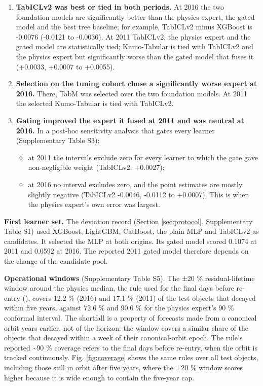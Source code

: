 \documentclass[
]{article}
\providecommand{\tightlist}{%
  \setlength{\itemsep}{0pt}\setlength{\parskip}{0pt}}
\begin{document}
\begin{enumerate}
\def\labelenumi{\arabic{enumi}.}
\tightlist
\item
  \textbf{TabICLv2 was best or tied in both periods.} At 2016 the two
  foundation models are significantly better than the physics expert,
  the gated model and the best tree baseline; for example, TabICLv2
  minus XGBoost is -0.0076 (-0.0121 to -0.0036). At 2011 TabICLv2, the
  physics expert and the gated model are statistically tied;
  Kumo-Tabular is tied with TabICLv2 and the physics expert but
  significantly worse than the gated model that fuses it (+0.0033,
  +0.0007 to +0.0055).
\item
  \textbf{Selection on the tuning cohort chose a significantly worse
  expert at 2016.} There, TabM was selected over the two foundation
  models. At 2011 the selected Kumo-Tabular is tied with TabICLv2.
\item
  \textbf{Gating improved the expert it fused at 2011 and was neutral at
  2016.} In a post-hoc sensitivity analysis that gates every learner
  (Supplementary Table S3):

  \begin{itemize}
  \tightlist
  \item
    at 2011 the intervals exclude zero for every learner to which the
    gate gave non-negligible weight (TabICLv2: +0.0027);
  \item
    at 2016 no interval excludes zero, and the point estimates are
    mostly slightly negative (TabICLv2 -0.0046, -0.0112 to +0.0007).
    This is when the physics expert's own error was largest.
  \end{itemize}
\end{enumerate}

\textbf{First learner set.} The deviation record (Section
\ref{sec:protocol}, Supplementary Table S1) used XGBoost, LightGBM,
CatBoost, the plain MLP and TabICLv2 as candidates. It selected the MLP
at both origins. Its gated model scored 0.1074 at 2011 and 0.0592 at
2016. The reported 2011 gated model therefore depends on the change of
the candidate pool.

\textbf{Operational windows} (Supplementary Table S5). The ±20 \%
residual-lifetime window around the physics median, the rule used for
the final days before re-entry
(), covers
12.2 \% (2016) and 17.1 \% (2011) of the test objects that decayed
within five years, against 72.6 \% and 90.6 \% for the physics expert's
90 \% conformal interval. The shortfall is a property of forecasts made
from a canonical orbit years earlier, not of the horizon: the window
covers a similar share of the objects that decayed within a week of
their canonical-orbit epoch. The rule's reported \textasciitilde90 \%
coverage refers to the final days before re-entry, when the orbit is
tracked continuously. Fig. \ref{fig:coverage} shows the same rules over
all test objects, including those still in orbit after five years, where
the ±20 \% window scores higher because it is wide enough to contain the
five-year cap.
\end{document}

